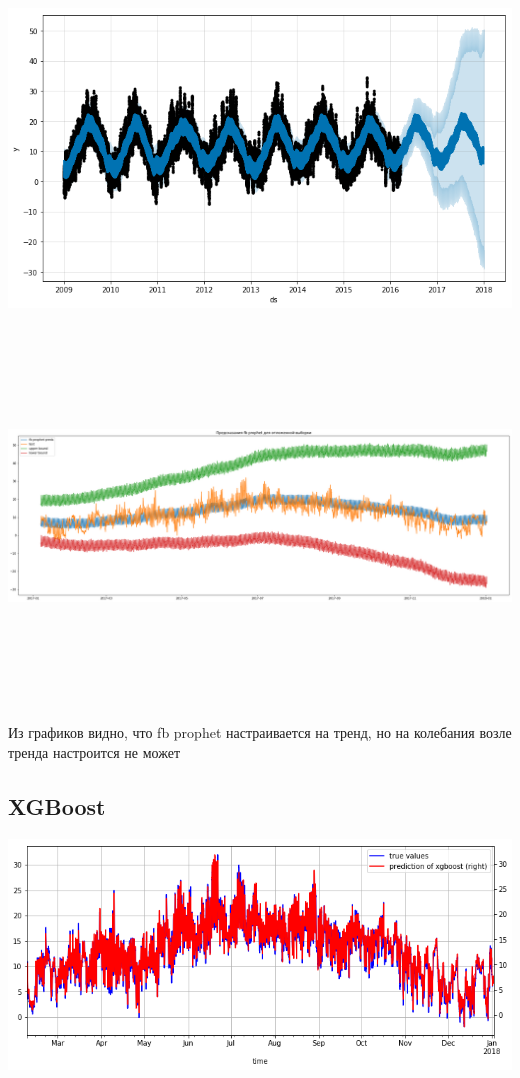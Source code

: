 \documentclass[11pt]{article}
\begin{document}
\begin{center}
\includegraphics[width=15cm]{./pics/fb_prophet_prediction_1.png}
\end{center}
\begin{center}
\includegraphics[width=15cm,height=10cm]{./pics/fb_prophet_prediction_2.png}
\end{center}

Из графиков видно, что fb prophet настраивается на тренд, но на колебания возле тренда настроится не может
\subsection{XGBoost}
\label{sec:org1f17f3d}
\begin{center}
\includegraphics[width=15cm]{./pics/xgboost_predictions_3_cities.png}
\end{center}
\end{document}
